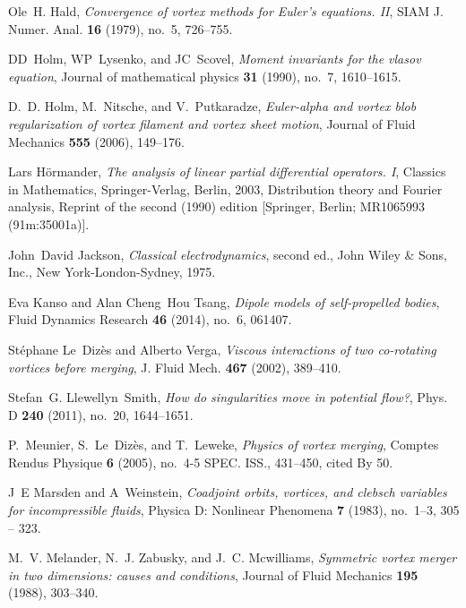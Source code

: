 \documentclass[12pt]{amsart}
\theoremstyle{remark}
\begin{document}
\begin{thebibliography}{FDMM91}
Ole~H. Hald, \emph{Convergence of vortex methods for {E}uler's equations.
  {II}}, SIAM J. Numer. Anal. \textbf{16} (1979), no.~5, 726--755. 

DD~Holm, WP~Lysenko, and JC~Scovel, \emph{Moment invariants for the vlasov
  equation}, Journal of mathematical physics \textbf{31} (1990), no.~7,
  1610--1615.

D.~D. {Holm}, M.~{Nitsche}, and V.~{Putkaradze}, \emph{{Euler-alpha and vortex
  blob regularization of vortex filament and vortex sheet motion}}, Journal of
  Fluid Mechanics \textbf{555} (2006), 149--176.

Lars H{\"o}rmander, \emph{The analysis of linear partial differential
  operators. {I}}, Classics in Mathematics, Springer-Verlag, Berlin, 2003,
  Distribution theory and Fourier analysis, Reprint of the second (1990)
  edition [Springer, Berlin; MR1065993 (91m:35001a)]. 

John~David Jackson, \emph{Classical electrodynamics}, second ed., John Wiley \&
  Sons, Inc., New York-London-Sydney, 1975. 

Eva Kanso and Alan Cheng~Hou Tsang, \emph{Dipole models of self-propelled
  bodies}, Fluid Dynamics Research \textbf{46} (2014), no.~6, 061407.

St{\'e}phane Le~Diz{\`e}s and Alberto Verga, \emph{Viscous interactions of two
  co-rotating vortices before merging}, J. Fluid Mech. \textbf{467} (2002),
  389--410. 

Stefan~G. Llewellyn~Smith, \emph{How do singularities move in potential flow?},
  Phys. D \textbf{240} (2011), no.~20, 1644--1651. 

P.~Meunier, S.~Le~Diz{\`e}s, and T.~Leweke, \emph{Physics of vortex merging},
  Comptes Rendus Physique \textbf{6} (2005), no.~4-5 SPEC. ISS., 431--450,
  cited By 50.

J~E Marsden and A~Weinstein, \emph{Coadjoint orbits, vortices, and clebsch
  variables for incompressible fluids}, Physica D: Nonlinear Phenomena
  \textbf{7} (1983), no.~1--3, 305 -- 323.

M.~V. Melander, N.~J. Zabusky, and J.~C. Mcwilliams, \emph{Symmetric vortex
  merger in two dimensions: causes and conditions}, Journal of Fluid Mechanics
  \textbf{195} (1988), 303--340.


\end{thebibliography}
\end{document}
